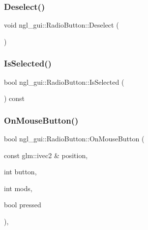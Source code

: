 \subsubsection{\texorpdfstring{Deselect()}{Deselect()}}
{\footnotesize\ttfamily void ngl\+\_\+gui\+::\+Radio\+Button\+::\+Deselect (\begin{DoxyParamCaption}{ }\end{DoxyParamCaption})\hspace{0.3cm}{\ttfamily [protected]}}

\mbox{\label{classngl__gui_1_1_radio_button_aee5f82544897695560fac4cfa7359016}} 
\subsubsection{\texorpdfstring{Is\+Selected()}{IsSelected()}}
{\footnotesize\ttfamily bool ngl\+\_\+gui\+::\+Radio\+Button\+::\+Is\+Selected (\begin{DoxyParamCaption}{ }\end{DoxyParamCaption}) const}

\mbox{\label{classngl__gui_1_1_radio_button_ab1593ae6fbd370c89c6c862a4ee58a92}} 
\subsubsection{\texorpdfstring{On\+Mouse\+Button()}{OnMouseButton()}}
{\footnotesize\ttfamily bool ngl\+\_\+gui\+::\+Radio\+Button\+::\+On\+Mouse\+Button (\begin{DoxyParamCaption}\item[{const glm\+::ivec2 \&}]{position,  }\item[{int}]{button,  }\item[{int}]{mods,  }\item[{bool}]{pressed }\end{DoxyParamCaption})\hspace{0.3cm}{\ttfamily [override]}, {\ttfamily [virtual]}}



